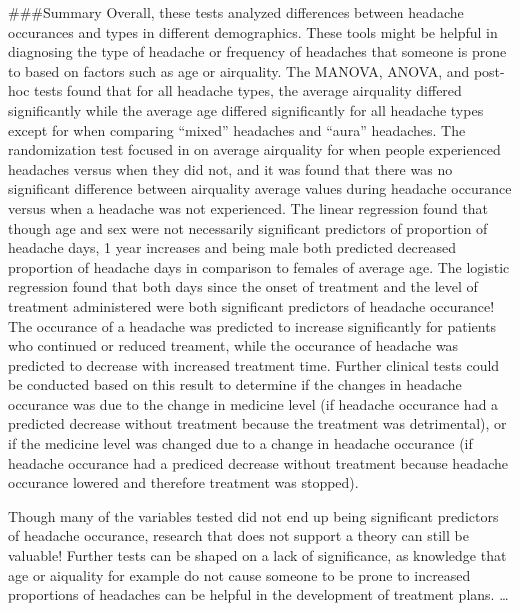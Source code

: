 \documentclass[]{article}
\begin{document}
\#\#\#Summary Overall, these tests analyzed differences between headache
occurances and types in different demographics. These tools might be
helpful in diagnosing the type of headache or frequency of headaches
that someone is prone to based on factors such as age or airquality. The
MANOVA, ANOVA, and post-hoc tests found that for all headache types, the
average airquality differed significantly while the average age differed
significantly for all headache types except for when comparing ``mixed''
headaches and ``aura'' headaches. The randomization test focused in on
average airquality for when people experienced headaches versus when
they did not, and it was found that there was no significant difference
between airquality average values during headache occurance versus when
a headache was not experienced. The linear regression found that though
age and sex were not necessarily significant predictors of proportion of
headache days, 1 year increases and being male both predicted decreased
proportion of headache days in comparison to females of average age. The
logistic regression found that both days since the onset of treatment
and the level of treatment administered were both significant predictors
of headache occurance! The occurance of a headache was predicted to
increase significantly for patients who continued or reduced treament,
while the occurance of headache was predicted to decrease with increased
treatment time. Further clinical tests could be conducted based on this
result to determine if the changes in headache occurance was due to the
change in medicine level (if headache occurance had a predicted decrease
without treatment because the treatment was detrimental), or if the
medicine level was changed due to a change in headache occurance (if
headache occurance had a prediced decrease without treatment because
headache occurance lowered and therefore treatment was stopped).

Though many of the variables tested did not end up being significant
predictors of headache occurance, research that does not support a
theory can still be valuable! Further tests can be shaped on a lack of
significance, as knowledge that age or aiquality for example do not
cause someone to be prone to increased proportions of headaches can be
helpful in the development of treatment plans. \ldots{}
\end{document}

